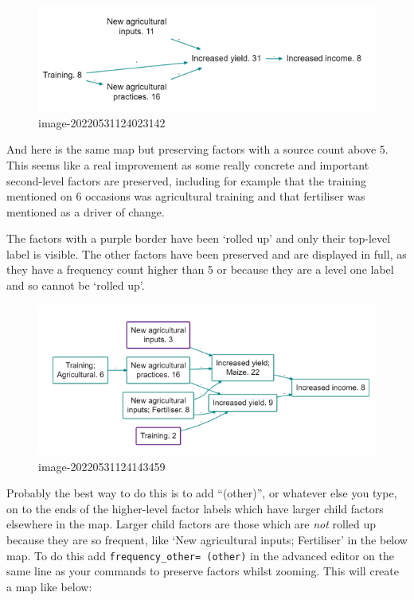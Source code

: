 \documentclass[
]{book}
\begin{document}
\begin{figure}
\centering
\includegraphics[width=5.72917in,height=\textheight]{_assets/image-20220531124023142.png}
\caption{image-20220531124023142}
\end{figure}

And here is the same map but preserving factors with a source count above 5. This seems like a real improvement as some really concrete and important second-level factors are preserved, including for example that the training mentioned on 6 occasions was agricultural training and that fertiliser was mentioned as a driver of change.

The factors with a purple border have been `rolled up' and only their top-level label is visible. The other factors have been preserved and are displayed in full, as they have a frequency count higher than 5 or because they are a level one label and so cannot be `rolled up'.

\begin{figure}
\centering
\includegraphics{_assets/image-20220531124143459.png}
\caption{image-20220531124143459}
\end{figure}

Probably the best way to do this is to add ``(other)'', or whatever else you type, on to the ends of the higher-level factor labels which have larger child factors elsewhere in the map. Larger child factors are those which are \emph{not} rolled up because they are so frequent, like `New agricultural inputs; Fertiliser' in the below map. To do this add \texttt{frequency\_other=\ (other)} in the advanced editor on the same line as your commands to preserve factors whilst zooming. This will create a map like below:
\end{document}
